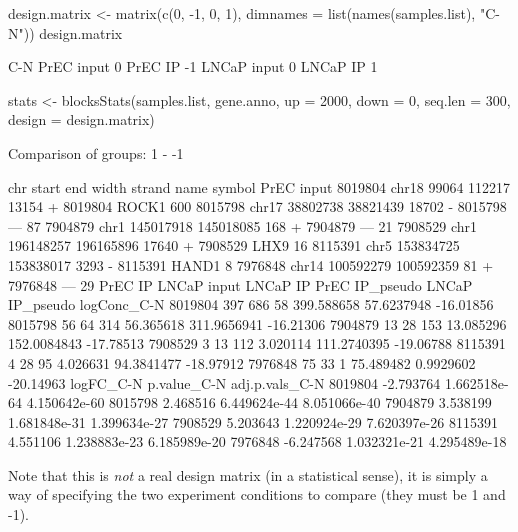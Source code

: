 \begin{Schunk}
\begin{Sinput}
 design.matrix <- matrix(c(0, -1, 0, 1), dimnames = list(names(samples.list), "C-N"))
 design.matrix
\end{Sinput}
\begin{Soutput}
            C-N
PrEC input    0
PrEC IP      -1
LNCaP input   0
LNCaP IP      1
\end{Soutput}
\begin{Sinput}
 stats <- blocksStats(samples.list, gene.anno, up = 2000, down = 0, seq.len = 300,
                      design = design.matrix)
\end{Sinput}
\begin{Soutput}
Comparison of groups:  1 - -1 
\end{Soutput}
\begin{Soutput}
          chr     start       end width strand    name symbol PrEC input
8019804 chr18     99064    112217 13154      + 8019804  ROCK1        600
8015798 chr17  38802738  38821439 18702      - 8015798    ---         87
7904879  chr1 145017918 145018085   168      + 7904879    ---         21
7908529  chr1 196148257 196165896 17640      + 7908529   LHX9         16
8115391  chr5 153834725 153838017  3293      - 8115391  HAND1          8
7976848 chr14 100592279 100592359    81      + 7976848    ---         29
        PrEC IP LNCaP input LNCaP IP PrEC IP_pseudo LNCaP IP_pseudo logConc_C-N
8019804     397         686       58     399.588658      57.6237948   -16.01856
8015798      56          64      314      56.365618     311.9656941   -16.21306
7904879      13          28      153      13.085296     152.0084843   -17.78513
7908529       3          13      112       3.020114     111.2740395   -19.06788
8115391       4          28       95       4.026631      94.3841477   -18.97912
7976848      75          33        1      75.489482       0.9929602   -20.14963
        logFC_C-N  p.value_C-N adj.p.vals_C-N
8019804 -2.793764 1.662518e-64   4.150642e-60
8015798  2.468516 6.449624e-44   8.051066e-40
7904879  3.538199 1.681848e-31   1.399634e-27
7908529  5.203643 1.220924e-29   7.620397e-26
8115391  4.551106 1.238883e-23   6.185989e-20
7976848 -6.247568 1.032321e-21   4.295489e-18
\end{Soutput}
\end{Schunk}

\noindent Note that this is {\em not} a real design matrix (in a statistical sense), it is simply a way of specifying the two experiment conditions to compare (they must be 1 and -1). \\

